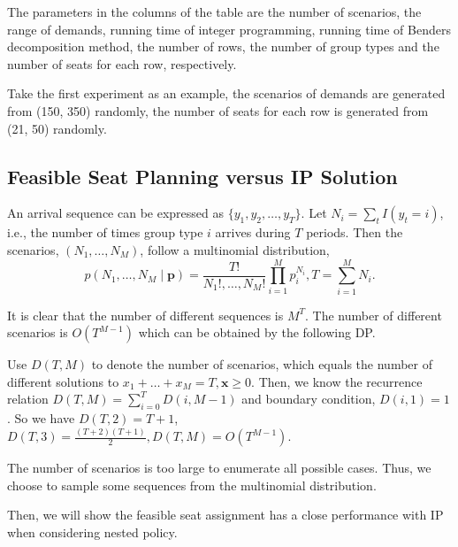 The parameters in the columns of the table are the number of scenarios, the range of demands, running time of integer programming, running time of Benders decomposition method, the number of rows, the number of group types and the number of seats for each row, respectively. 

Take the first experiment as an example, the scenarios of demands are generated from (150, 350) randomly, the number of seats for each row is generated from (21, 50) randomly.



\subsection{Feasible Seat Planning versus IP Solution}
An arrival sequence can be expressed as $\{y_{1}, y_{2}, \ldots, y_{T}\}$. Let $N_{i} = \sum_{t} I(y_t = i)$, i.e., the number of times group type $i$ arrives during $T$ periods. Then the scenarios, $(N_1, \ldots, N_{M})$, follow a multinomial distribution, $$p\left(N_1, \ldots, N_{M} \mid \mathbf{p}\right)=\frac{T !}{N_{1}!, \ldots, N_{M}!} \prod_{i=1}^{M} p_{i}^{N_i}, T = \sum_{i=1}^{M} N_{i}.$$

It is clear that the number of different sequences is $M^{T}$. The number of different scenarios is $O(T^{M-1})$ which can be obtained by the following DP.

Use $D(T, M) $ to denote the number of scenarios, which equals the number of different solutions to $x_{1}+\ldots + x_{M} = T, \mathbf{x} \geq 0$. Then, we know the recurrence relation $D(T, M) = \sum_{i= 0}^{T} D(i, M-1)$ and boundary condition, $D(i,1) = 1$. So we have $D(T,2) = T+1$, $D(T,3) = \frac{(T+2)(T+1)}{2}, D(T,M) = O(T^{M-1})$. 

The number of scenarios is too large to enumerate all possible cases. Thus, we choose to sample some sequences from the multinomial distribution.

Then, we will show the feasible seat assignment has a close performance with IP when considering nested policy.


